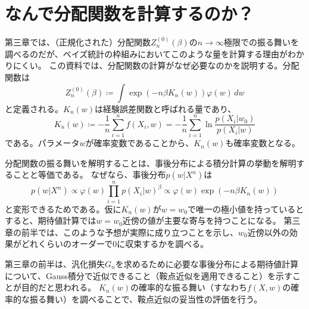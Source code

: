 \documentclass[dvipdfmx]{jsarticle}
\begin{document}
\section{なんで分配関数を計算するのか？}
第三章では、（正規化された）分配関数$Z_n^{(0)}(\beta)$の$n\to\infty$極限での振る舞いを調べるのだが、ベイズ統計の枠組みにおいてこのような量を計算する理由がわかりにくい。
この資料では、分配関数の計算がなぜ必要なのかを説明する。分配関数は
\begin{equation}
    Z_n^{(0)}(\beta) \coloneqq \int\exp(-n\beta K_n(w))\varphi(w)\,dw
\end{equation}
と定義される。$K_n(w)$は経験誤差関数と呼ばれる量であり、
\begin{equation}
    K_n(w) \coloneqq -\frac{1}{n}\sum_{i=1}^n f(X_i, w) = -\frac{1}{n}\sum_{i=1}^n \ln \frac{p(X_i|w_0)}{p(X_i|w)}
\end{equation}
である。パラメータ$w$が確率変数であることから、$K_n(w)$も確率変数となる。

\begin{mybox}[事後分布による期待値計算と分配関数]
    分配関数の振る舞いを解明することは、事後分布による積分計算の挙動を解明することと等価である。
    なぜなら、事後分布$p(w|X^n)$は
    \begin{equation}
        p(w|X^n) \propto \varphi(w)\prod_{i=1}^{n}p(X_i|w)^{\beta} \propto \varphi(w)\exp(-n\beta K_n(w))
    \end{equation}
    と変形できるためである。仮に$K_n(w)$が$w=w_0$で唯一の極小値を持っているとすると、期待値計算では$w=w_0$近傍の値が主要な寄与を持つことになる。
    第三章の前半では、このような予想が実際に成り立つことを示し、$w_0$近傍以外の効果がどれくらいのオーダーで$0$に収束するかを調べる。
\end{mybox}

第三章の前半は、汎化損失$G_n$を求めるために必要な事後分布による期待値計算について、Gauss積分で近似できること（鞍点近似を適用できること）を示すことが目的だと思われる。
$K_n(w)$の確率的な振る舞い（すなわち$f(X, w)$の確率的な振る舞い）を調べることで、鞍点近似の妥当性の評価を行う。
\end{document}
